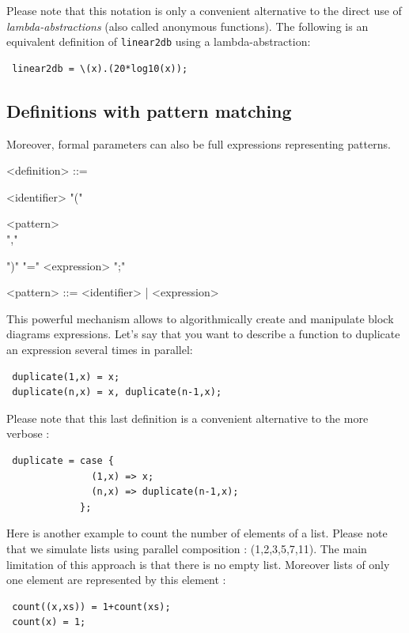 \documentclass[a4paper,10pt]{book}
\begin{document}
Please note that this notation is only a convenient alternative to the direct use of \textit{lambda-abstractions} (also called anonymous functions). The following is an equivalent definition of \lstinline'linear2db' using a lambda-abstraction:

\begin{lstlisting}
 linear2db = \(x).(20*log10(x));
\end{lstlisting}


\subsection{Definitions with pattern matching}

Moreover, formal parameters can also be full expressions representing patterns. 

\begin{grammar}
  <definition> ::= 
  \begin{syntdiag}
    <identifier> "(" 
    \begin{rep}
      <pattern> \\ ","
    \end{rep}
    ")" "=" <expression> ";"
  \end{syntdiag}
\end{grammar}

\begin{grammar}
  <pattern> ::= 
    <identifier> |  <expression>
\end{grammar}

This powerful mechanism allows to algorithmically create and manipulate block diagrams expressions. Let's say that you want to describe a function to duplicate an expression several times in parallel:
\begin{lstlisting}
 duplicate(1,x) = x;
 duplicate(n,x) = x, duplicate(n-1,x);
\end{lstlisting}

Please note that this last definition is a convenient alternative to the more verbose :
\begin{lstlisting}
 duplicate = case { 
               (1,x) => x; 
               (n,x) => duplicate(n-1,x); 
             };
\end{lstlisting}

Here is another example to count the number of elements of a list. Please note that we simulate lists using parallel composition : (1,2,3,5,7,11). The main limitation of this approach is that there is no empty list. Moreover lists of only one element are represented by this element :
\begin{lstlisting}
 count((x,xs)) = 1+count(xs);
 count(x) = 1;
\end{lstlisting}
\end{document}
